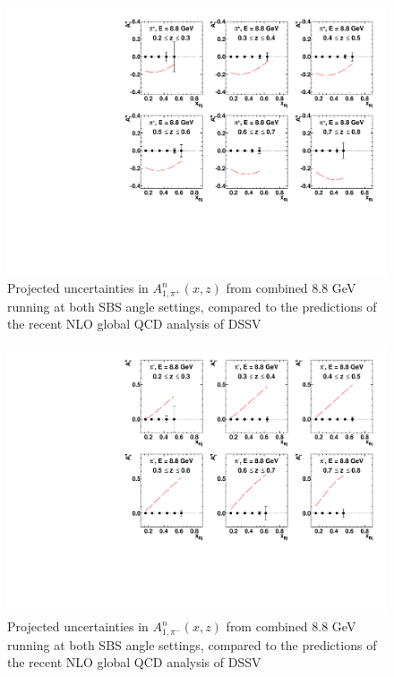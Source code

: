 \begin{figure}[h]
  \begin{center}
    \includegraphics[width=.75\textwidth]{figures/A1n_vs_x_E88_pip.pdf}
  \end{center}
  \caption{\label{A1n_pip_88gev} Projected uncertainties in $A_{1,\pi^+}^{n}(x,z)$ from combined 8.8 GeV running at both SBS angle settings, compared to the predictions of the recent NLO global QCD analysis of DSSV~\cite{DSSVplus}}
\end{figure}
\begin{figure}[h]
  \begin{center}
    \includegraphics[width=.75\textwidth]{figures/A1n_vs_x_E88_pim.pdf}
  \end{center}
  \caption{\label{A1n_pim_88gev} Projected uncertainties in $A_{1,\pi^-}^{n}(x,z)$ from combined 8.8 GeV running at both SBS angle settings, compared to the predictions of the recent NLO global QCD analysis of DSSV~\cite{DSSVplus}}
\end{figure}
